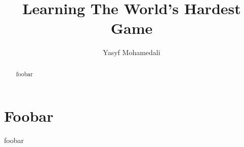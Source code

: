 \documentclass[preprint,12pt]{elsarticle}
\begin{document}
\begin{frontmatter}
\title{Learning The World's Hardest Game}

\author{Yasyf Mohamedali}

\address{6.867 Project Proposal}

\begin{abstract}
foobar
\end{abstract}
\end{frontmatter}

\section{Foobar}
foobar
\end{document}
